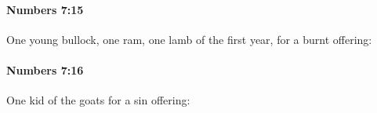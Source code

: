		\paragraph{Numbers 7:15} %
			\label{NUMBERS-7-15}

			One young bullock, one ram, one lamb of the first year, for a burnt offering:


		\paragraph{Numbers 7:16} %
			\label{NUMBERS-7-16}

			One kid of the goats for a sin offering:


